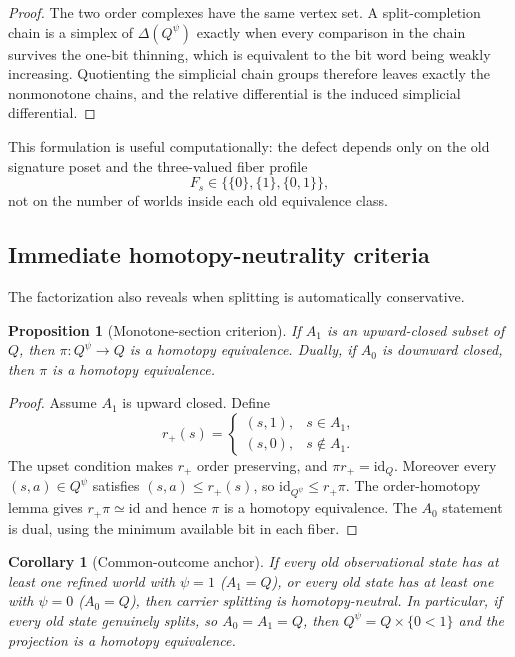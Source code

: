 \documentclass[11pt]{article}
\newtheorem{proposition}[theorem]{Proposition}
\newtheorem{corollary}[theorem]{Corollary}
\begin{document}
\begin{proof}
The two order complexes have the same vertex set.  A split-completion chain is a
simplex of $\Delta(Q^\psi)$ exactly when every comparison in the chain survives
the one-bit thinning, which is equivalent to the bit word being weakly increasing.
Quotienting the simplicial chain groups therefore leaves exactly the nonmonotone
chains, and the relative differential is the induced simplicial differential.
\end{proof}

This formulation is useful computationally: the defect depends only on the old
signature poset and the three-valued fiber profile
\[
 F_s\in\bigl\{\{0\},\{1\},\{0,1\}\bigr\},
\]
not on the number of worlds inside each old equivalence class.

\subsection{Immediate homotopy-neutrality criteria}

The factorization also reveals when splitting is automatically conservative.

\begin{proposition}[Monotone-section criterion]\label{prop:monotone-section}
If $A_1$ is an upward-closed subset of $Q$, then $\pi:Q^\psi\to Q$ is a
homotopy equivalence.  Dually, if $A_0$ is downward closed, then $\pi$ is a
homotopy equivalence.
\end{proposition}

\begin{proof}
Assume $A_1$ is upward closed.  Define
\[
 r_+(s)=
 \begin{cases}
 (s,1),&s\in A_1,\\
 (s,0),&s\notin A_1.
 \end{cases}
\]
The upset condition makes $r_+$ order preserving, and $\pi r_+=\mathrm{id}_Q$.
Moreover every $(s,a)\in Q^\psi$ satisfies $(s,a)\leq r_+(s)$, so
$\mathrm{id}_{Q^\psi}\leq r_+\pi$.  The order-homotopy lemma gives
$r_+\pi\simeq\mathrm{id}$ and hence $\pi$ is a homotopy equivalence.  The
$A_0$ statement is dual, using the minimum available bit in each fiber.
\end{proof}

\begin{corollary}[Common-outcome anchor]
If every old observational state has at least one refined world with $\psi=1$
($A_1=Q$), or every old state has at least one with $\psi=0$ ($A_0=Q$), then
carrier splitting is homotopy-neutral.  In particular, if every old state genuinely
splits, so $A_0=A_1=Q$, then $Q^\psi=Q\times\{0<1\}$ and the projection is a
homotopy equivalence.
\end{corollary}
\end{document}
